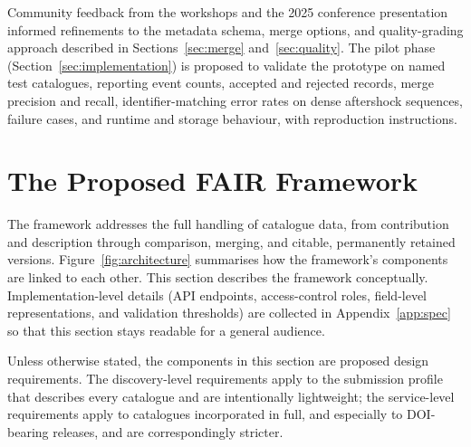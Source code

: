 \documentclass[11pt]{article}
\begin{document}
Community feedback from the workshops and the 2025 conference presentation informed refinements to the metadata schema, merge options, and quality-grading approach described in Sections~\ref{sec:merge} and~\ref{sec:quality}. The pilot phase (Section~\ref{sec:implementation}) is proposed to validate the prototype on named test catalogues, reporting event counts, accepted and rejected records, merge precision and recall, identifier-matching error rates on dense aftershock sequences, failure cases, and runtime and storage behaviour, with reproduction instructions.

\section{The Proposed FAIR Framework}
\label{sec:framework}
The framework addresses the full handling of catalogue data, from contribution and description through comparison, merging, and citable, permanently retained versions. Figure~\ref{fig:architecture} summarises how the framework's components are linked to each other. This section describes the framework conceptually. Implementation-level details (API endpoints, access-control roles, field-level representations, and validation thresholds) are collected in Appendix~\ref{app:spec} so that this section stays readable for a general audience.

Unless otherwise stated, the components in this section are proposed design requirements. The discovery-level requirements apply to the submission profile that describes every catalogue and are intentionally lightweight; the service-level requirements apply to catalogues incorporated in full, and especially to DOI-bearing releases, and are correspondingly stricter.
\end{document}
